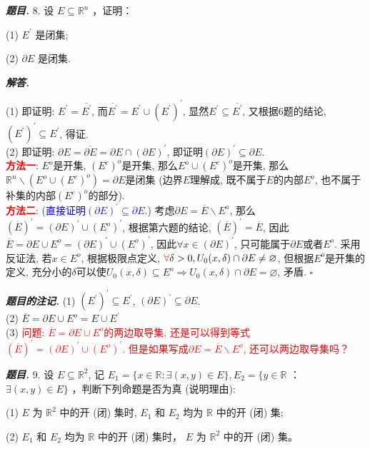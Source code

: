 \documentclass[10pt, a4paper, oneside]{ctexart}
\newenvironment{problem}{\begin{framed}\par\noindent\textbf{\textit{题目. }}}{\end{framed}\par}
\newenvironment{solution}{%
  \par\noindent\textbf{\textit{解答. }}\ignorespaces
}{%
  \hfill\ensuremath{\square}\par %
}
\newenvironment{note}{\par\noindent\textbf{\textit{题目的注记. }}\ignorespaces}{\par}
\begin{document}
\begin{problem}
8. 设 $E \subseteq \mathbb{R}^n$ ，证明：

(1) $E^{\prime}$ 是闭集;

(2) $\partial E$ 是闭集.
\end{problem}

\begin{solution}
(1) 即证明: $E^{\prime}=\overline{E^{\prime}}$, 而$\overline{E^{\prime}}=E^{\prime}\cup (E^{\prime})^{\prime}$, 显然$E^{\prime}\subseteq \overline{E^{\prime}}$, 又根据6题的结论, $(E^{\prime})^{\prime}\subseteq E^{\prime}$, 得证.\\
(2) 即证明: $\partial E = \overline{\partial E}=\partial E\cap (\partial E)^{\prime}$, 即证明$(\partial E)^{\prime}\subseteq \partial E$.\\
\textbf{\textcolor{red}{方法一}}: $E^{o}$是开集, $(E^{c})^{o}$是开集, 那么$E^{o}\cup (E^{c})^{o}$是开集, 那么$\mathbb{R}^n \backslash (E^{o}\cup (E^{c})^{o}) = \partial E$是闭集 (边界$E$理解成, 既不属于$E$的内部$E^{o}$, 也不属于补集的内部$(E^{c})^{o}$的部分).\\
\textbf{\textcolor{red}{方法二}}: (\textcolor{blue}{直接证明$(\partial E)^{\prime}\subseteq \partial E$.}) 考虑$\partial E=\overline{E}\backslash E^{o}$, 那么$(\overline{E})^{\prime}=(\partial E)^{\prime}\cup (E^{o})^{\prime}$, 根据第六题的结论, $(\overline{E})^{\prime}=\overline{E}$, 因此$\overline{E}=\partial E \cup E^{o}= (\partial E)^{\prime}\cup (E^{o})^{\prime}$, 因此$\forall x\in (\partial E)^{\prime}$, 只可能属于$\partial E$或者$E^{o}$. 采用反证法, 若$x\in E^{o}$, 根据极限点定义, $\textcolor{red}{\forall} \delta>0, U_0(x,\delta)\cap \partial E\neq \varnothing$, 但根据$E^{o}$是开集的定义, 充分小的$\delta$可以使$U_0(x,\delta)\subseteq E^{o}\Rightarrow U_0(x,\delta)\cap \partial E=\varnothing$, 矛盾. 
\end{solution}
\begin{note}
    (1) $(E^{\prime})^{\prime}\subseteq E^{\prime}$, $(\partial E)^{\prime}\subseteq \partial E$.\\
    (2) $\overline{E}=\partial E\cup E^{o} = E\cup E^{\prime}$\\
    (3) \textcolor{red}{问题: $\overline{E}=\partial E\cup E^{o} $的两边取导集, 还是可以得到等式$(\overline{E})^{\prime}=(\partial E)^{\prime}\cup (E^{o})^{\prime}$. 但是如果写成$\partial E=\overline{E}\backslash E^{o}$, 还可以两边取导集吗？}
\end{note}

\begin{problem}
9. 设 $E \subseteq \mathbb{R}^2$, 记 $E_1=\{x \in \mathbb{R}: \exists(x, y) \in E\}, E_2=\{y \in \mathbb{R}$ ： $\exists(x, y) \in E\}$ ，判断下列命题是否为真 (说明理由):

(1) $E$ 为 $\mathbb{R}^2$ 中的开 (闭) 集时, $E_1$ 和 $E_2$ 均为 $\mathbb{R}$ 中的开 (闭) 集;

(2) $E_1$ 和 $E_2$ 均为 $\mathbb{R}$ 中的开 (闭) 集时， $E$ 为 $\mathbb{R}^2$ 中的开 (闭) 集。
\end{problem}
\end{document}
